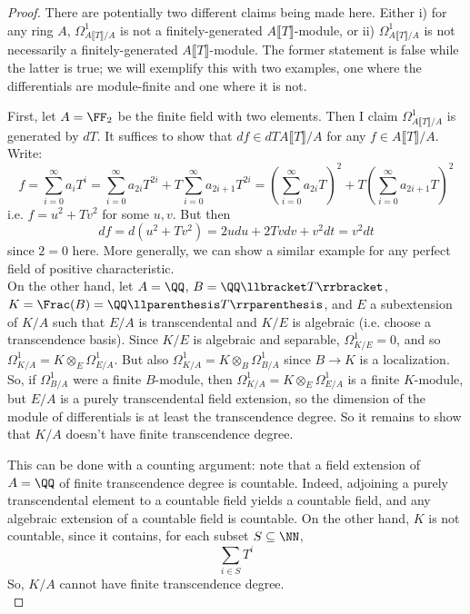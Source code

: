 \begin{proof}
	There are potentially two different claims being made here. Either i) for any ring $A$, $\Omega^1_{A \llbracket T \rrbracket/A}$ is not a finitely-generated $A \llbracket T \rrbracket$-module, or ii) $\Omega^1_{A \llbracket T \rrbracket/A}$ is not necessarily a finitely-generated $A \llbracket T \rrbracket$-module. The former statement is false while the latter is true; we will exemplify this with two examples, one where the differentials are module-finite and one where it is not.
	
	First, let $A = \FF_2$ be the finite field with two elements. Then I claim $\Omega^1_{A \llbracket T \rrbracket/A}$ is generated by $dT$. It suffices to show that $df \in dTA \llbracket T \rrbracket/A$ for any $f \in A \llbracket T \rrbracket/A$. Write:
	\[ f = \sum_{i=0}^\infty a_iT^i = \sum_{i=0}^\infty a_{2i}T^{2i} + T\sum_{i=0}^\infty a_{2i+1}T^{2i} = \left(\sum_{i=0}^\infty a_{2i}T\right)^2 + T\left(\sum_{i=0}^\infty a_{2i+1}T\right)^2 \]
	i.e. $f = u^2 + Tv^2$ for some $u,v$. But then
	\[ df = d(u^2+Tv^2) = 2udu + 2Tvdv + v^2dt = v^2dt \]
	since $2=0$ here. More generally, we can show a similar example for any perfect field of positive characteristic. \\
	
	On the other hand, let $A = \QQ$, $B = \QQ \llbracket T \rrbracket$, $K = \Frac(B) = \QQ \llparenthesis T \rrparenthesis$, and $E$ a subextension of $K/A$ such that $E/A$ is transcendental and $K/E$ is algebraic (i.e. choose a transcendence basis). Since $K/E$ is algebraic and separable, $\Omega^1_{K/E} = 0$, and so $\Omega^1_{K/A} = K \otimes_E \Omega^1_{E/A}$. But also $\Omega^1_{K/A} = K \otimes_B \Omega^1_{B/A}$ since $B \to K$ is a localization. So, if $\Omega^1_{B/A}$ were a finite $B$-module, then $\Omega^1_{K/A} = K \otimes_E \Omega^1_{E/A}$ is a finite $K$-module, but $E/A$ is a purely transcendental field extension, so the dimension of the module of differentials is at least the transcendence degree. So it remains to show that $K/A$ doesn't have finite transcendence degree.
	
	This can be done with a counting argument: note that a field extension of $A = \QQ$ of finite transcendence degree is countable. Indeed, adjoining a purely transcendental element to a countable field yields a countable field, and any algebraic extension of a countable field is countable. On the other hand, $K$ is not countable, since it contains, for each subset $S \subseteq \NN$,
	\[ \sum_{i \in S} T^i \]
	So, $K/A$ cannot have finite transcendence degree. \\
	

\end{proof}
